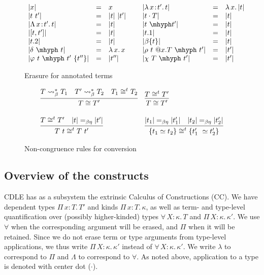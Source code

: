 \documentclass{article}
\newcommand{\abs}[4]{{#1}\, #2\! : \! #3.\, #4}
\newcommand{\absu}[3]{{#1}\, #2.\, #3}
\begin{document}
\begin{figure}
  \[
  \begin{array}{lllllll}
    |x| & = & x &\ &
    |\abs{\lambda}{x}{t'}{t}| & = & \absu{\lambda}{x}{|t|} \\
    |t\ t'| & = & |t|\ |t'| &\ &
    |t\cdot T| & = & |t| \\
    |\abs{\Lambda}{x}{t'}{t}| & = & |t| &\ &
    |t\ \mhyph t'| & = & |t| \\
    |[t , t']| & = & |t| &\ &
    |t.1| & = & |t| \\
    |t.2| & = & |t| &\ &
    |\beta\{t\}| & = & |t|\\
    |\delta\ \mhyph\ t| & = & \absu{\lambda}{x}{x}&\ &
    |\rho\ t\ @x.T\ \mhyph\ t'| & = & |t'| \\
    |\varphi\ t\ \mhyph\ t'\ \{t''\}| & = & |t''| &\ &
    |\chi\ T\ \mhyph\ t'| & = & |t'|
  \end{array}
  \]
  \caption{Erasure for annotated terms}
  \label{fig:eraser}
\end{figure}  

\begin{figure}
  \[
  \begin{array}{ll}
    \infer{T \cong T'}{T \leadsto^*_\beta T_1 & T' \leadsto^*_\beta T_2 & T_1\cong^t T_2}  & 
    \infer{T \cong T'}{T \cong^t T'} \\ \\
    \infer{T\ t \cong^t T\ t'}{T \cong^t T' & |t| =_{\beta\eta} |t'|} &
    \infer{\{ t_1 \simeq t_2 \} \cong^t \{ t_1'\ \simeq t_2' \}}{|t_1| =_{\beta\eta} |t_1'| & |t_2| =_{\beta\eta} |t_2'|}
  \end{array}
  \]
  \caption{Non-congruence rules for conversion}
  \label{fig:conv}
\end{figure}  

\subsection{Overview of the constructs}
\label{sec:overview}

CDLE has as a subsystem the extrinsic Calculus of
Constructions (CC).  We have dependent types
$\abs{\Pi}{x}{T}{T'}$ and kinds $\abs{\Pi}{x}{T}{\kappa}$, as well as
term- and type-level quantification over (possibly higher-kinded)
types $\abs{\forall}{X}{\kappa}{T}$ and
$\abs{\Pi}{X}{\kappa}{\kappa'}$.  We use $\forall$ when the
corresponding argument will be erased, and $\Pi$ when it will be
retained.  Since we do not erase term or type arguments from
type-level applications, we thus write $\abs{\Pi}{X}{\kappa}{\kappa'}$
instead of $\abs{\forall}{X}{\kappa}{\kappa'}$.  We write $\lambda$ to
correspond to $\Pi$ and $\Lambda$ to correspond to $\forall$.  As noted
above, application to a type is denoted with center dot ($\cdot$).
\end{document}
